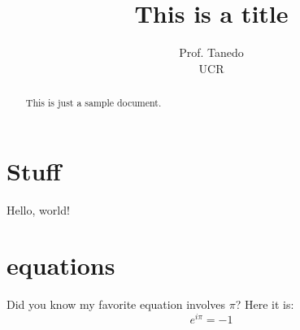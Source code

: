 \documentclass[12pt]{article}
\begin{document}
\title{This is a title}
\author{
    Prof. Tanedo\\
    UCR
}

    

\maketitle

\begin{abstract}
    This is just a sample document.
\end{abstract}

\section{Stuff}

Hello, world!

\lipsum[1-2]

\section{equations}

Did you know my favorite equation involves $\pi$? Here it is:
$$e^{i\pi} = -1$$
\end{document}
